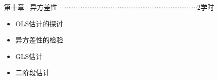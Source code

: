 \noindent 第十章 \ 异方差性
$ \cdots\cdots\cdots\cdots\cdots\cdots\cdots\cdots\cdots\cdots\cdots\cdots\cdots\cdots\cdots
\cdots\cdots\cdots\cdots\cdots\cdots\cdots\cdots\cdots\cdots\cdots \text{2学时} $
\begin{itemize}
	\setlength{\itemsep}{-2pt}
	\item OLS估计的探讨
	\item 异方差性的检验
	\item GLS估计
	\item 二阶段估计
\end{itemize}			